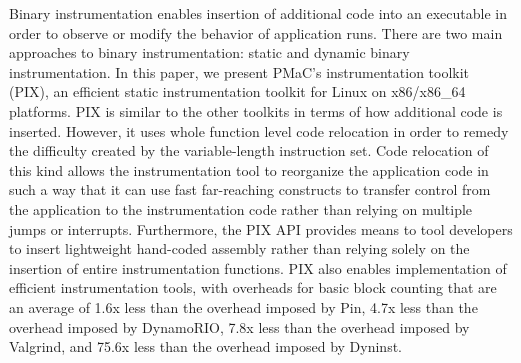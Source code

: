 \begin{it}

Binary instrumentation enables insertion of additional code into an
executable in order to observe or modify the behavior of application runs. 
There are two main approaches to binary instrumentation: static and dynamic
binary instrumentation. In this paper, we present PMaC's instrumentation toolkit (PIX), 
an efficient static  instrumentation toolkit for Linux on x86/x86\_64 platforms. PIX
is similar to the other toolkits in terms of how additional code is inserted. However, it uses whole function level
code relocation in order to remedy the difficulty created by the variable-length instruction set. Code relocation of this kind allows the
instrumentation tool to reorganize the application code in such a way that it
can use  fast  far-reaching constructs to transfer control
from the application to the instrumentation code rather than relying on multiple
jumps or interrupts. Furthermore, the PIX API provides means to
tool developers to insert lightweight hand-coded assembly
rather than relying solely on the insertion of entire instrumentation functions.
PIX also enables implementation of efficient instrumentation tools, 
with overheads for basic block counting that are an
average of 1.6x less than the overhead imposed by Pin, 4.7x less than the overhead imposed by
DynamoRIO, 7.8x less than the overhead imposed by Valgrind, and 75.6x less than the overhead imposed by Dyninst.

\end{it}
